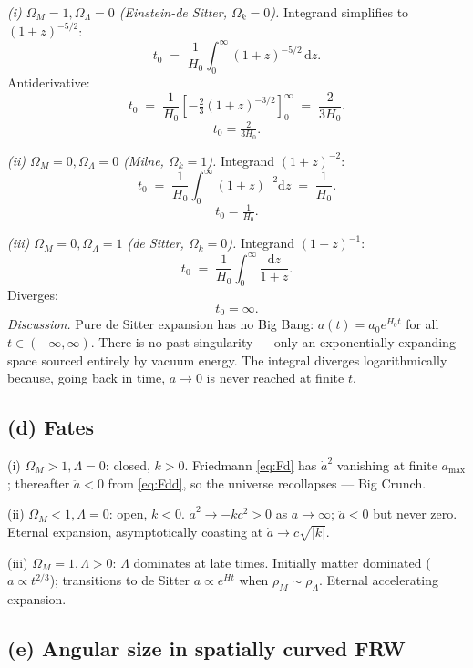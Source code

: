 \documentclass[11pt]{article}
\newcommand{\de}{\mathrm{d}}
\begin{document}
\textit{(i) $\Omega_M=1,\Omega_\Lambda=0$ (Einstein-de Sitter, $\Omega_k=0$).} Integrand simplifies to $(1+z)^{-5/2}$:
\[
t_0 \;=\; \frac{1}{H_0}\!\int_0^\infty (1+z)^{-5/2}\,\de z.
\]
Antiderivative:
\[
t_0 \;=\; \frac{1}{H_0}\!\left[-\tfrac{2}{3}(1+z)^{-3/2}\right]_0^\infty \;=\; \frac{2}{3H_0}.
\]
\[
\boxed{\;t_0=\tfrac{2}{3H_0}.\;}
\]

\textit{(ii) $\Omega_M=0,\Omega_\Lambda=0$ (Milne, $\Omega_k=1$).} Integrand $(1+z)^{-2}$:
\[
t_0 \;=\; \frac{1}{H_0}\!\int_0^\infty(1+z)^{-2}\de z \;=\; \frac{1}{H_0}.
\]
\[
\boxed{\;t_0=\tfrac{1}{H_0}.\;}
\]

\textit{(iii) $\Omega_M=0,\Omega_\Lambda=1$ (de Sitter, $\Omega_k=0$).} Integrand $(1+z)^{-1}$:
\[
t_0 \;=\; \frac{1}{H_0}\!\int_0^\infty\frac{\de z}{1+z}.
\]
Diverges:
\[
\boxed{\;t_0=\infty.\;}
\]
\textit{Discussion.} Pure de Sitter expansion has no Big Bang: $a(t)=a_0 e^{H_0 t}$ for all $t\in(-\infty,\infty)$. There is no past singularity --- only an exponentially expanding space sourced entirely by vacuum energy. The integral diverges logarithmically because, going back in time, $a\to 0$ is never reached at finite $t$.

\subsection*{(d) Fates}

(i) $\Omega_M>1,\Lambda=0$: closed, $k>0$. Friedmann \eqref{eq:Fd} has $\dot a^2$ vanishing at finite $a_{\max}$; thereafter $\ddot a<0$ from \eqref{eq:Fdd}, so the universe recollapses --- Big Crunch.

(ii) $\Omega_M<1,\Lambda=0$: open, $k<0$. $\dot a^2\to -kc^2>0$ as $a\to\infty$; $\ddot a<0$ but never zero. Eternal expansion, asymptotically coasting at $\dot a\to c\sqrt{|k|}$.

(iii) $\Omega_M=1,\Lambda>0$: $\Lambda$ dominates at late times. Initially matter dominated ($a\propto t^{2/3}$); transitions to de Sitter $a\propto e^{Ht}$ when $\rho_M\sim\rho_\Lambda$. Eternal accelerating expansion.

\subsection*{(e) Angular size in spatially curved FRW}
\end{document}
